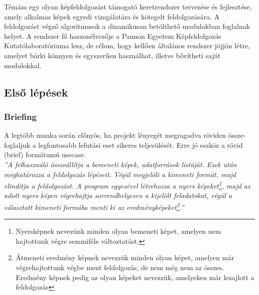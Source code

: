 \documentclass[a4paper,12pt,oneside]{report}
\begin{document}
Témám egy olyan képfeldolgozást támogató keretrendszer tervezése és fejlesztése, amely alkalmas képek egyedi vizsgálatára és kötegelt feldolgozására. A feldolgozást végző algoritmusok a dinamikusan betölthető modulokban foglalnak helyet. A rendszer fő haszonélvezője a Pannon Egyetem Képfeldolgozás Kutatólaboratóriuma lesz, de célom, hogy kellően általános rendszer jöjjön létre, amelyet bárki könnyen és egyszerűen használhat, illetve bővítheti saját modulokkal.

\subsection{Első lépések}
\subsubsection{Briefing}
A legtöbb munka során előnyös, ha projekt lényegét megragadva röviden össze-foglaljuk a legfontosabb lefutási eset sikeres teljesülését. Erre jó eszköz a rövid (brief\cite{book:usecase_book_brief}) formátumú usecase.
\\\emph{''A felhasználó összeállítja a bemeneti képek, adatforrások listáját. Ezek után meghatározza a feldolgozás lépéseit. Végül megjelöli a kimeneti formát, majd elindítja a feldolgozást. A program egyesével létrehozza a nyers képeket\footnote{Nyersképnek nevezünk minden olyan bemeneti képet, amelyen nem hajtottunk végre semmiféle változtatást.}, majd az adott nyers képen végrehajtja sorrendhelyesen a kijelölt feladatokat, végül a választott kimeneti formába menti ki az eredményképeket\footnote{Átmeneti eredmény képnek nevezzük minden olyan képet, amelyen már végrehajtottunk végbe ment feldolgozás, de nem még nem az összes. Eredmény képnek pedig az olyan képeket nevezzük, amelyeken már lezajlott a feldolgozás}.''}
\end{document}

